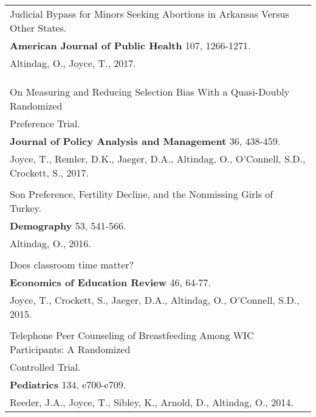 \documentclass[12 pt]{article}
\begin{document}
\begin{longtable}{ccccc}
\\
   \multicolumn{5}{l}{Judicial Bypass for Minors Seeking Abortions in Arkansas Versus Other States.} \\
    \multicolumn{5}{l}{\textbf{American Journal of Public Health} 107, 1266-1271. 
} \\
    \multicolumn{5}{l}{Altindag, O., Joyce, T., 2017.}  \\
 
\\
\\
\\

   \multicolumn{5}{l}{On Measuring and Reducing Selection Bias With a Quasi-Doubly Randomized} \\
      \multicolumn{5}{l}{Preference Trial.} \\
     \multicolumn{5}{l}{\textbf{Journal of Policy Analysis and Management} 36, 438-459. } \\
      \multicolumn{5}{l}{Joyce, T., Remler, D.K., Jaeger, D.A., Altindag, O., O'Connell, S.D., Crockett, S., 2017. } \\

 \\

   \multicolumn{5}{l}{Son Preference, Fertility Decline, and the Nonmissing Girls of Turkey.} \\
     \multicolumn{5}{l}{\textbf{Demography}  53, 541-566. } \\
      \multicolumn{5}{l}{Altindag, O., 2016. } \\

\\
   \multicolumn{5}{l}{Does classroom time matter?} \\
     \multicolumn{5}{l}{\textbf{Economics of Education Review} 46, 64-77. } \\
      \multicolumn{5}{l}{Joyce, T., Crockett, S., Jaeger, D.A., Altindag, O., O'Connell, S.D., 2015.} \\

 \\

   \multicolumn{5}{l}{Telephone Peer Counseling of Breastfeeding Among WIC Participants: A Randomized} \\
      \multicolumn{5}{l}{ Controlled Trial.} \\
     \multicolumn{5}{l}{\textbf{Pediatrics} 134, e700-e709. } \\
      \multicolumn{5}{l}{Reeder, J.A., Joyce, T., Sibley, K., Arnold, D., Altindag, O., 2014. } \\



\end{longtable}
\end{document}
